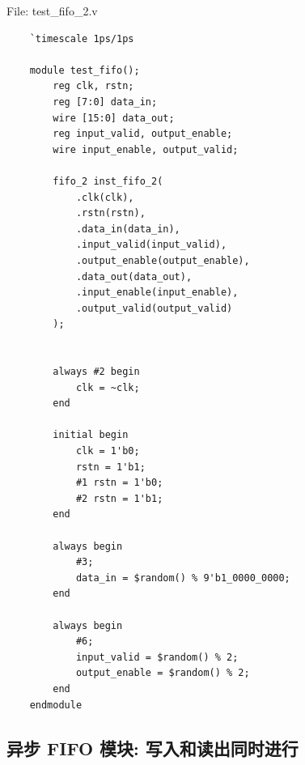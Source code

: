 \documentclass{article}
\begin{document}
File: test\_fifo\_2.v
\begin{lstlisting}
    `timescale 1ps/1ps

    module test_fifo();
        reg clk, rstn;
        reg [7:0] data_in;
        wire [15:0] data_out;
        reg input_valid, output_enable;
        wire input_enable, output_valid;
    
        fifo_2 inst_fifo_2(
            .clk(clk),
            .rstn(rstn),
            .data_in(data_in),
            .input_valid(input_valid),
            .output_enable(output_enable),
            .data_out(data_out),
            .input_enable(input_enable),
            .output_valid(output_valid)
        );
    
    
        always #2 begin
            clk = ~clk;
        end
    
        initial begin
            clk = 1'b0;
            rstn = 1'b1;
            #1 rstn = 1'b0;
            #2 rstn = 1'b1;
        end
    
        always begin
            #3;
            data_in = $random() % 9'b1_0000_0000;
        end
    
        always begin
            #6;
            input_valid = $random() % 2;
            output_enable = $random() % 2;
        end
    endmodule
\end{lstlisting}

\subsection{异步 FIFO 模块: 写入和读出同时进行}
\end{document}
